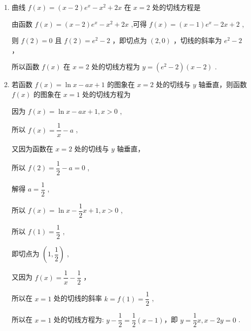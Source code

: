\begin{enumerate}
\begin{enumerate}
        \item 曲线 $f\left( x\right)  = \left( {x - 2}\right) {{e}}^{x} - {x}^{2} + {2x}$ 在 $x = 2$ 处的切线方程是
        \begin{jieda}
            由函数 $f\left( x\right)  = \left( {x - 2}\right) {{e}}^{x} - {x}^{2} + {2x}$ ,可得 $f\left( x\right)  = \left( {x - 1}\right) {{e}}^{x} - {2x} + 2$ ,
            
            则 $f\left( 2\right)  = 0$ 且 $f\left( 2\right)  = {{e}}^{2} - 2$ ，即切点为 $\left( {2,0}\right)$ ，切线的斜率为 ${{e}}^{2} - 2$ ，
            
            所以函数 $f\left( x\right)$ 在 $x = 2$ 处的切线方程为 $y = \left( {{{e}}^{2} - 2}\right) \left( {x - 2}\right)$ .
        \end{jieda}
        
        \item 若函数 $f\left( x\right)  = \ln x - {ax} + 1$ 的图象在 $x = 2$ 处的切线与 $y$ 轴垂直，则函数 $f\left( x\right)$ 的图象在 $x = 1$ 处的切线方程为
        \begin{jieda}
            因为 $f\left( x\right)  = \ln x - {ax} + 1,x > 0$ ,

            所以 $f\left( x\right)  = \dfrac{1}{x} - a$ ,
            
            又因为函数在 $x = 2$ 处的切线与 $y$ 轴垂直，
            
            所以 $f\left( 2\right)  = \dfrac{1}{2} - a = 0$ ,
            
            解得 $a = \dfrac{1}{2}$ ,
            
            所以 $f\left( x\right)  = \ln x - \dfrac{1}{2}x + 1,x > 0$ ,
            
            所以 $f\left( 1\right)  = \dfrac{1}{2}$ ,
            
            即切点为 $\left( {1,\dfrac{1}{2}}\right)$ ,
            
            又因为 $f\left( x\right)  = \dfrac{1}{x} - \dfrac{1}{2}$ ，
            
            所以在 $x = 1$ 处的切线的斜率 $k = f\left( 1\right)  = \dfrac{1}{2}$ ,
            
            所以在 $x = 1$ 处的切线方程为: $y - \dfrac{1}{2} = \dfrac{1}{2}\left( {x - 1}\right)$，即 $y = \dfrac{1}{2}x,x - {2y} = 0$ .
        \end{jieda}
        

\end{enumerate}
\end{enumerate}
